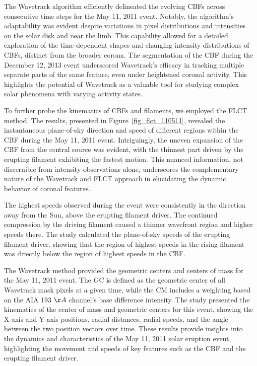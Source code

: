 The Wavetrack algorithm efficiently delineated the evolving CBFs across consecutive time steps for the May 11, 2011 event. Notably, the algorithm's adaptability was evident despite variations in pixel distributions and intensities on the solar disk and near the limb. This capability allowed for a detailed exploration of the time-dependent shapes and changing intensity distributions of CBFs, distinct from the broader corona.
The segmentation of the CBF during the December 12, 2013 event underscored Wavetrack's efficacy in tracking multiple separate parts of the same feature, even under heightened coronal activity. This highlights the potential of Wavetrack as a valuable tool for studying complex solar phenomena with varying activity states.

To further probe the kinematics of CBFs and filaments, we employed the FLCT method. The results, presented in Figure~\ref{fig_flct_110511}, revealed the instantaneous plane-of-sky direction and speed of different regions within the CBF during the May 11, 2011 event. Intriguingly, the uneven expansion of the CBF from the central source was evident, with the thinnest part driven by the erupting filament exhibiting the fastest motion. This nuanced information, not discernible from intensity observations alone, underscores the complementary nature of the Wavetrack and FLCT approach in elucidating the dynamic behavior of coronal features.

The highest speeds observed during the event were consistently in the direction away from the Sun, above the erupting filament driver. The continued compression by the driving filament caused a thinner wavefront region and higher speeds there. The study calculated the plane-of-sky speeds of the erupting filament driver, showing that the region of highest speeds in the rising filament was directly below the region of highest speeds in the CBF.

The Wavetrack method provided the geometric centers and centers of mass for the May 11, 2011 event. The GC is defined as the geometric center of all Wavetrack mask pixels at a given time, while the CM includes a weighting based on the AIA 193 $\AA$ channel's base difference intensity. The study presented the kinematics of the center of mass and geometric centers for this event, showing the X-axis and Y-axis positions, radial distances, radial speeds, and the angle between the two position vectors over time.
These results provide insights into the dynamics and characteristics of the May 11, 2011 solar eruption event, highlighting the movement and speeds of key features such as the CBF and the erupting filament driver.

